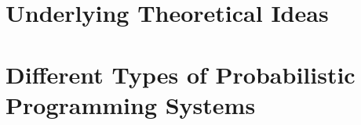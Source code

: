 \documentclass[AERbeamer%
              ,optEnglish%
              ,optBiber%
              ,optBibstyleAlphabetic%
              ,optBeamerClassicFormat%
              ]{AERlatex}%
\begin{document}
\section{Underlying Theoretical Ideas}




\section{Different Types of Probabilistic Programming Systems}







%
%
%
%
\end{document}
